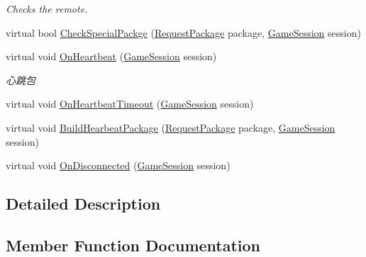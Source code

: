 \begin{DoxyCompactItemize}
\begin{DoxyCompactList}\small\item\em Checks the remote. \end{DoxyCompactList}\item 
virtual bool \mbox{\hyperlink{class_t_net_1_1_contract_1_1_game_base_host_ad41941ac456ea489c0abbc0bc673533b}{Check\+Special\+Packge}} (\mbox{\hyperlink{class_t_net_1_1_contract_1_1_request_package}{Request\+Package}} package, \mbox{\hyperlink{class_t_net_1_1_contract_1_1_game_session}{Game\+Session}} session)
\item 
virtual void \mbox{\hyperlink{class_t_net_1_1_contract_1_1_game_base_host_ac1394511cfb25f6692ccce54a83fdb9d}{On\+Heartbeat}} (\mbox{\hyperlink{class_t_net_1_1_contract_1_1_game_session}{Game\+Session}} session)
\begin{DoxyCompactList}\small\item\em 心跳包 \end{DoxyCompactList}\item 
virtual void \mbox{\hyperlink{class_t_net_1_1_contract_1_1_game_base_host_a191e95fd9011f435370a84f22a15c3ff}{On\+Heartbeat\+Timeout}} (\mbox{\hyperlink{class_t_net_1_1_contract_1_1_game_session}{Game\+Session}} session)
\item 
virtual void \mbox{\hyperlink{class_t_net_1_1_contract_1_1_game_base_host_a1ee7a32afa8974fbd906e2dd4451f726}{Build\+Hearbeat\+Package}} (\mbox{\hyperlink{class_t_net_1_1_contract_1_1_request_package}{Request\+Package}} package, \mbox{\hyperlink{class_t_net_1_1_contract_1_1_game_session}{Game\+Session}} session)
\item 
virtual void \mbox{\hyperlink{class_t_net_1_1_contract_1_1_game_base_host_a2614d516b774492909c22473fda82586}{On\+Disconnected}} (\mbox{\hyperlink{class_t_net_1_1_contract_1_1_game_session}{Game\+Session}} session)
\end{DoxyCompactItemize}


\subsection{Detailed Description}




\subsection{Member Function Documentation}
\mbox{\label{class_t_net_1_1_contract_1_1_game_base_host_a1ee7a32afa8974fbd906e2dd4451f726}} 
